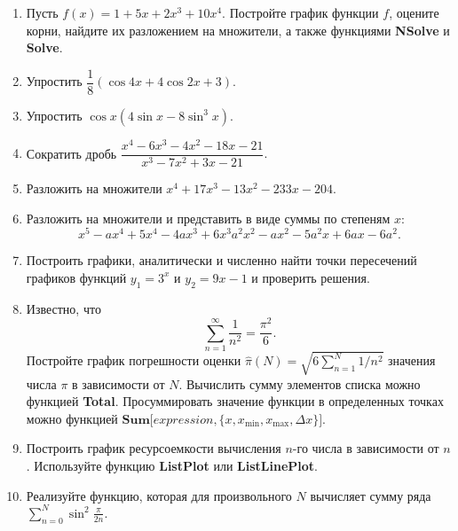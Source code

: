 \documentclass[preview]{standalone}
\begin{document}
\begin{enumerate}
	\item Пусть $f(x)=1+5x + 2x^3 + 10x^4$. Постройте график функции $f$, оцените корни, найдите их разложением на множители, а также функциями \textbf{NSolve} и \textbf{Solve}. 
	\item Упростить $\dfrac{1}{8}(\cos4x + 4\cos2x + 3)$.
	\item Упростить $\cos x(4\sin x - 8\sin^3 x)$.
	\item Сократить дробь $\dfrac{x^4 - 6x^3 - 4x^2 - 18x - 21}{x^3 - 7x^2 +3x - 21}.$
	\item Разложить на множители $x^4 + 17x^3 - 13x^2 - 233x - 204$.
	\item Разложить на множители и представить в виде суммы по степеням $x$:
	\[
	x^5 - ax^4 + 5x^4 - 4ax^3 + 6x^3  a^2 x^2 - a x^2 - 5a^2 x + 6 a x - 6a^2.
	\]
	\item Построить графики, аналитически и численно найти точки пересечений графиков функций $y_1=3^x$ и $y_2=9x-1$  и проверить решения.
	\item Известно, что 
	\[
	\sum_{n=1}^{\infty} \dfrac{1}{n^2} = \dfrac{\pi^2}{6}.
	\]
	Постройте график погрешности оценки $\hat{\pi}(N)=\sqrt{6\sum_{n=1}^N 1/n^2}$ значения числа $\pi$ в зависимости от $N$. Вычислить сумму элементов списка можно функцией \textbf{Total}. Просуммировать значение функции в определенных точках можно функцией $ \textbf{Sum[}expression, \{x, x_{\min}, x_{\max}, \Delta x \}\textbf{]}$.  
	\item Построить график ресурсоемкости вычисления $n$-го числа в зависимости от $n$. Используйте функцию \textbf{ListPlot} или \textbf{ListLinePlot}.
	\item Реализуйте функцию, которая для произвольного $N$ вычисляет сумму ряда
	$
	\sum_{n=0}^{N}\sin^2 \frac{\pi}{2n}.
	$
	
\end{enumerate}
\end{document}
